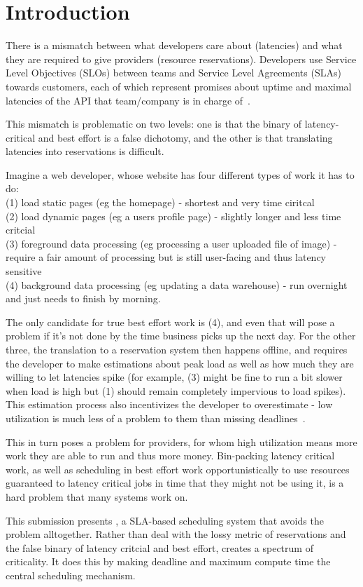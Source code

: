 \section{Introduction}

There is a mismatch between what developers care about (latencies) and what they
are required to give providers (resource reservations). Developers use Service
Level Objectives (SLOs) between teams and Service Level Agreements (SLAs)
towards customers, each of which represent promises about uptime and maximal
latencies of the API that team/company is in charge of~\cite{awssla, cloudwatch}. 

This mismatch is problematic on two levels: one is that the binary of
latency-critical and best effort is a false dichotomy, and the other is that
translating latencies into reservations is difficult. 

Imagine a web developer, whose website has four different types of work it has
to do: \\
(1) load static pages (eg the homepage) - shortest and very time ciritcal \\
(2) load dynamic pages (eg a users profile page) - slightly longer and less time
critcial \\
(3) foreground data processing (eg processing a user uploaded file of image) -
require a fair amount of processing but is still user-facing and thus latency sensitive \\
(4) background data processing (eg updating a data warehouse) - run overnight
and just needs to finish by morning.

The only candidate for true best effort work is (4), and even that will pose a
problem if it's not done by the time business picks up the next day. For the
other three, the translation to a reservation system then happens offline, and
requires the developer to make estimations about peak load as well as how much
they are willing to let latencies spike (for example, (3) might be fine to run a
bit slower when load is high but (1) should remain completely impervious to load
spikes). This estimation process also incentivizes the developer to overestimate
- low utilization is much less of a problem to them than missing deadlines~\cite*{overprovision}. 

This in turn poses a problem for providers, for whom high utilization means more
work they are able to run and thus more money. Bin-packing latency critical
work, as well as scheduling in best effort work opportunistically to use
resources guaranteed to latency critical jobs in time that they might not be
using it, is a hard problem that many systems work on.

This submission presents \textit{\sysname}, a SLA-based scheduling system that
avoids the problem alltogether. Rather than deal with the lossy metric of
reservations and the false binary of latency critcial and best effort,
\sysname{} creates a spectrum of criticality. It does this by making deadline
and maximum compute time the central scheduling mechanism.
